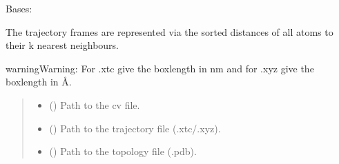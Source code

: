 \documentclass[a4paper,10pt,english]{report}
\begin{document}
\begin{fulllineitems}
\label{\detokenize{NNucleate:NNucleate.dataset.KNNTrajectory}}
\pysigstartsignatures
{}
\pysigstopsignatures
\sphinxAtStartPar
Bases: 
\begin{description}
\sphinxAtStartPar
The trajectory frames are represented via the sorted distances of all atoms to their k nearest neighbours.

\end{description}

\begin{sphinxadmonition}{warning}{Warning:}
\sphinxAtStartPar
For .xtc give the boxlength in nm and for .xyz give the boxlength in Å.
\end{sphinxadmonition}
\begin{quote}\begin{description}
\begin{itemize}
\item {} 
\sphinxAtStartPar
{} () \textendash{} Path to the cv file.

\item {} 
\sphinxAtStartPar
{} () \textendash{} Path to the trajectory file (.xtc/.xyz).

\item {} 
\sphinxAtStartPar
{} () \textendash{} Path to the topology file (.pdb).


\end{itemize}
\end{description}
\end{quote}
\end{fulllineitems}
\end{document}
